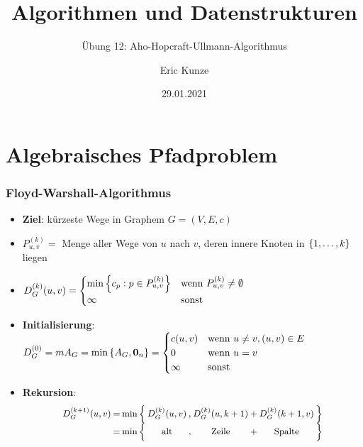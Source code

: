 \documentclass{beamer}
\begin{document}
	
	\title{Algorithmen und Datenstrukturen}
	\subtitle{Übung 12: Aho-Hopcraft-Ullmann-Algorithmus}
	\author{Eric Kunze}
	\date{29.01.2021}

	\maketitle


\section{Algebraisches Pfadproblem}

\begin{frame} \frametitle{Floyd-Warshall-Algorithmus}
	\small
	\begin{itemize}
		\item \textbf{Ziel}: kürzeste Wege in Graphem $G=(V,E,c)$
		\item $P^{(k)}_{u,v} =$ Menge aller Wege von $u$ nach $v$, deren innere Knoten in $\left\{ 1, \dots, k \right\}$ liegen
		\item $D_G^{(k)} (u,v) = \begin{cases}
			\min\left\{ c_p : p \in P_{u,v}^{(k)} \right\} & \text{wenn } P_{u,v}^{(k)} \neq \emptyset \\
			\infty & \text{sonst}
		\end{cases}$
	
		\bigskip
		
		\item \textbf{Initialisierung}: $D_G^{(0)} = mA_G = \min\left\{ A_G, \mathbf{0}_n \right\} = \begin{cases}
		c(u,v) & \text{wenn } u \neq v, (u,v) \in E \\
		0 & \text{wenn } u = v \\
		\infty & \text{sonst}
		\end{cases}$
		\item \textbf{Rekursion}:
		\begin{equation*}
			\small
			\setlength{\arraycolsep}{1pt}
			\begin{array}{rclcccccl}
				D_G^{(k+1)}(u,v) &=& \min \Big\{ & D_G^{(k)}(u,v) & , & D_G^{(k)}(u,k+1) & + & D_G^{(k)}(k+1,v) & \Big\}  \\
				&=& \min \Big\{ & \text{alt} & , & \text{Zeile} & + & \text{Spalte} & \Big\}
			\end{array}
		\end{equation*}
	\end{itemize}
\end{frame}
\end{document}
